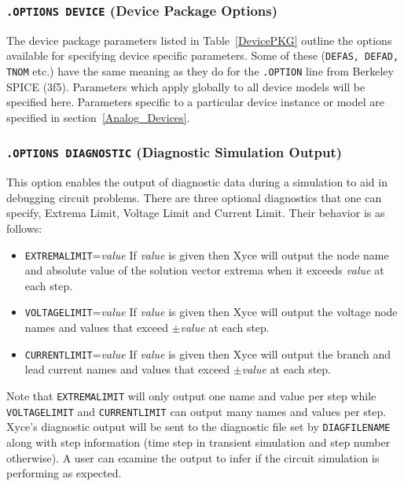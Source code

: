 \subsubsection{\texttt{.OPTIONS DEVICE} (Device Package Options)}

The device package parameters listed in Table~\ref{DevicePKG} outline the options
available for specifying device specific parameters.  Some of these (\texttt{DEFAS,
DEFAD, TNOM} etc.) have the same meaning as they do for
the \texttt{.OPTION} line from Berkeley SPICE (3f5).  Parameters which
apply globally to all device models will be specified here.
Parameters specific to a particular device instance or model are
specified in section~\ref{Analog_Devices}.



\subsubsection{\texttt{.OPTIONS DIAGNOSTIC} (Diagnostic Simulation Output)}

This option enables the output of diagnostic data during a simulation to aid
in debugging circuit problems.  There are three optional diagnostics that one 
can specify, Extrema Limit, Voltage Limit and Current Limit.  Their behavior 
is as follows:
\begin{itemize}
  \item \texttt{EXTREMALIMIT}={\em value}  If {\em value} is given then Xyce will output 
  the node name and absolute value of the solution vector extrema  when it exceeds 
  {\em value} at each step.
  \item \texttt{VOLTAGELIMIT}={\em value} If {\em value} is given then Xyce will output
  the voltage node names and values that exceed {\em $\pm$value} at each step.
  \item \texttt{CURRENTLIMIT}={\em value} If {\em value} is given then Xyce will output
  the branch and lead current names and values that exceed {\em $\pm$value} at each step.
\end{itemize}

Note that \texttt{EXTREMALIMIT} will only output one name and value per step while
\texttt{VOLTAGELIMIT} and \texttt{CURRENTLIMIT} can output many names and values 
per step.  Xyce's diagnostic output will be sent to the diagnostic file set by 
\texttt{DIAGFILENAME} along with step information (time step in transient simulation 
and step number otherwise). A user can examine the output to infer if the circuit 
simulation is performing as expected.

